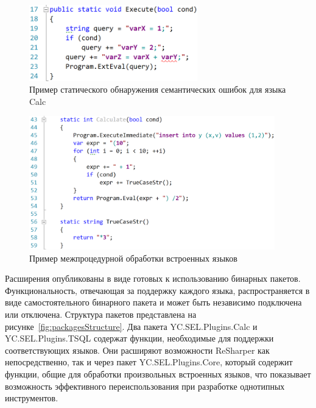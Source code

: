 \begin{figure}[H]
  \centering
 \includegraphics[width=0.65\textwidth]{pics/undefined_variable.png}
 \caption{Пример статического обнаружения семантических ошибок для языка Calc}
 \label{fig:undeclaredVars}
\end{figure}

\begin{figure}[H]
  \centering
 \includegraphics[width=0.95\textwidth]{pics/sql_calc_cycle.png}
 \caption{Пример межпроцедурной обработки встроенных языков}
 \label{fig:interProc}
\end{figure}

Расширения опубликованы в виде готовых к использованию бинарных пакетов. Функциональность, отвечающая за поддержку каждого языка, распространяется в виде самостоятельного бинарного пакета и может быть независимо подключена или отключена. Структура пакетов представлена на рисунке~\ref{fig:packagesStructure}. Два пакета YC.SEL.Plugins.Calc и YC.SEL.Plugins.TSQL содержат функции, необходимые для поддержки соответствующих языков. Они расширяют возможности ReSharper как непосредственно, так и через пакет YC.SEL.Plugins.Core, который содержит функции, общие для обработки произвольных встроенных языков, что показывает возможность эффективного переиспользования при разработке однотипных инструментов.

